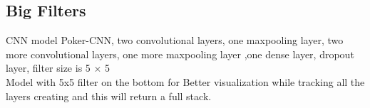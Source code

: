 \documentclass[review]{elsarticle}
\begin{document}

\subsection*{Big Filters}

CNN model Poker-CNN, two convolutional layers, one maxpooling layer, 
two more convolutional layers, one more maxpooling layer ,one dense layer, 
dropout layer, filter size is 5 $\times$ 5 \\

Model with 5x5 filter on the bottom for Better visualization while 
tracking all the layers creating and this will return a full stack.
\end{document}
